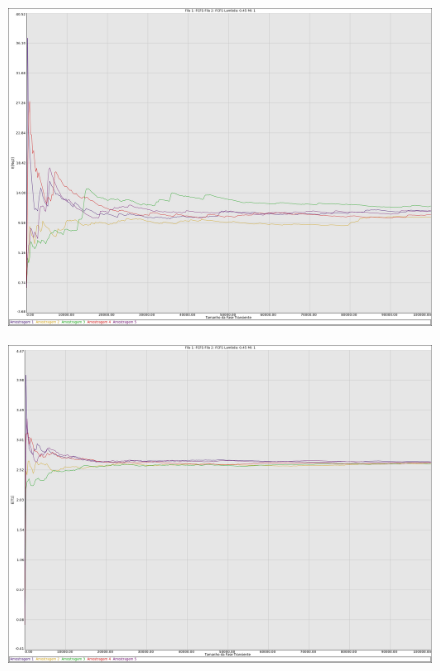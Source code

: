 \documentclass[a4paper,10pt]{article}
\begin{document}
\pagebreak

\begin{figure}
\includegraphics[scale = 0.2]{./graficos_transiente_1/FCFS/04.png}
\end{figure}
\begin{figure}
\includegraphics[scale = 0.2]{./graficos_transiente_1/FCFS/05.png}
\end{figure}
\end{document}

